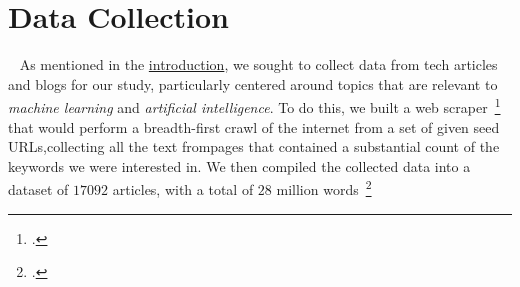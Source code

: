 \section{Data Collection}~\label{sec:data-collection}
As mentioned in the \hyperref[sec:introduction]{introduction},
we sought to collect data from tech articles and blogs for our study, particularly
centered around topics that are relevant to \emph{machine learning} and \emph{artificial intelligence}.
To do this, we built a web scraper~\footcite[The source-code is available on GitHub; see ][]{functional-scraper}
that would perform a breadth-first crawl of the internet from
a set of given seed URLs,collecting all the text frompages that contained
a substantial count of the keywords we were interested in.
We then compiled the collected data into a dataset of
$17092$ articles, with a total of $28$ million
words~\footcite[The dataset is now open-sorce and available on Huggingface; see ][]{ai_dataset_2023}

